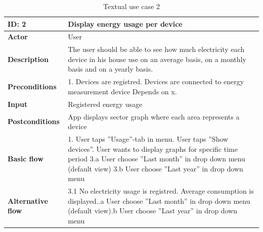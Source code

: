 \begin{table}[H]
\begin{tabular}{|l|p{11.7cm}|}
\hline
\textbf{ID: }2&\textbf{Display energy usage per device}\\\hline
\textbf{Actor} &User\\\hline
\textbf{Description}&
The user should be able to see how much electricity each device in his house use on an average basis, on a monthly basis and on a yearly basis.\\\hline
\textbf{Preconditions}&
1. Devices are registred\newline
2. Devices are connected to energy measurement device\newline
Depends on x.\\\hline
\textbf{Input}&
Registered energy usage\\\hline
\textbf{Postconditions}& App displays sector graph where each area represents a device\\\hline
\textbf{Basic flow}&
1. User taps ''Usage''-tab in menu\newline
2. User taps ''Show devices''\newline
3. User wants to display graphs for specific time period\newline
3.a User choose ''Last month'' in drop down menu (default view)\newline
3.b User choose ''Last year'' in drop down menu\\\hline
\textbf{Alternative flow}&
3.1 No electricity usage is registred. Average consumption is displayed.\newline
3.1.a User choose ''Last month'' in drop down menu (default view)\newline
3.1.b User choose ''Last year'' in drop down menu\\\hline
\end{tabular}
\caption{Textual use case 2}
\end{table}

